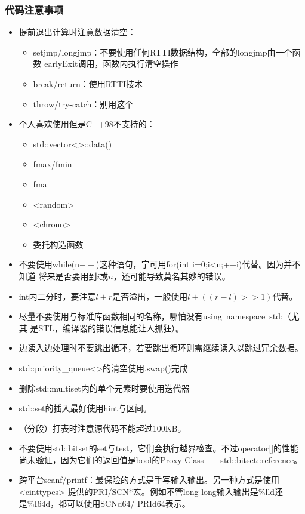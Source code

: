 \subsubsection{代码注意事项}
\begin{itemize}
	\item 提前退出计算时注意数据清空：
	\begin{itemize}
		\item setjmp/longjmp：不要使用任何RTTI数据结构，全部的longjmp由一个函数
		earlyExit调用，函数内执行清空操作
		\item break/return：使用RTTI技术
		\item throw/try-catch：别用这个
	\end{itemize}
	\item 个人喜欢使用但是C++98不支持的：
	\begin{itemize}
		\item std::vector<>::data()
		\item fmax/fmin
		\item fma
		\item <random>
		\item <chrono>
		\item 委托构造函数
	\end{itemize}
	\item 不要使用while(n$--$)这种语句，宁可用for(int i=0;i<n;++i)代替。因为并不知道
		  将来是否要用到$i$或$n$，还可能导致莫名其妙的错误。
	\item int内二分时，要注意$l+r$是否溢出，一般使用$l+((r-l)>>1)$代替。
	\item 尽量不要使用与标准库函数相同的名称，哪怕没有using~namespace~std;（尤其
	是STL，编译器的错误信息能让人抓狂）。
	\item 边读入边处理时不要跳出循环，若要跳出循环则需继续读入以跳过冗余数据。
	\item std::priority\_queue<>的清空使用.swap()完成
	\item 删除std::multiset内的单个元素时要使用迭代器
	\item std::set的插入最好使用hint与区间。
	\item （分段）打表时注意源代码不能超过100KB。
	\item 不要使用std::bitset的set与test，它们会执行越界检查。不过operator[]的性能
	尚未验证，因为它们的返回值是bool的Proxy Class------std::bitset::reference。
	\item 跨平台scanf/printf：最保险的方式是手写输入输出。另一种方式是使用<cinttypes>
	提供的PRI/SCN*宏。例如不管long long输入输出是\%lld还是\%I64d，都可以使用SCNd64/
	PRId64表示。

\end{itemize}
